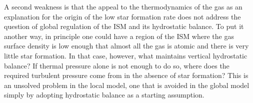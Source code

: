 A second weakness is that the appeal to the thermodynamics of the gas as an explanation for the origin of the low star formation rate does not address the question of global regulation of the ISM and its hydrostatic balance. To put it another way, in principle one could have a region of the ISM where the gas surface density is low enough that almost all the gas is atomic and there is very little star formation. In that case, however, what maintains vertical hydrostatic balance? If thermal pressure alone is not enough to do so, where does the required turbulent pressure come from in the absence of star formation? This is an unsolved problem in the local model, one that is avoided in the global model simply by adopting hydrostatic balance as a starting assumption.

